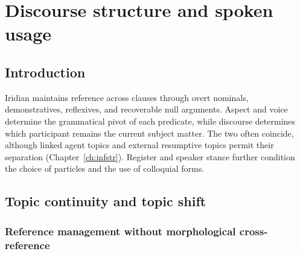 \chapter{Discourse structure and spoken usage}
\label{ch:discourse}\label{ch:spoken}\label{ch:semantics}


\section{Introduction}\label{sec:discourse-intro}

Iridian maintains reference across clauses through overt nominals,
 demonstratives, reflexives, and recoverable null arguments. Aspect and voice
 determine the grammatical pivot of each predicate, while discourse determines
 which participant remains the current subject matter. The two often
 coincide, although linked agent topics and external resumptive topics permit
 their separation (Chapter~\ref{ch:infstr}). Register and speaker stance
 further condition the choice of particles and the use of colloquial forms.

%
%

\section{Topic continuity and topic shift}\label{sec:topic-continuity}


\subsection{Reference management without morphological cross-reference}
\label{sec:ref-management}

